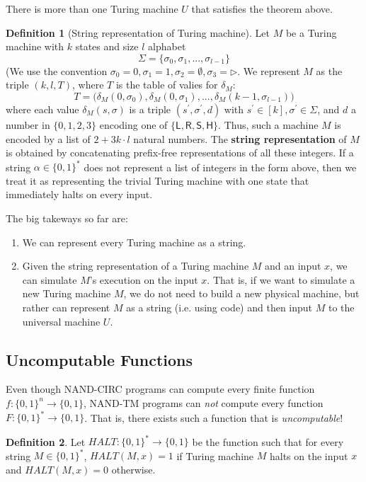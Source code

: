 \documentclass[a4paper, 12pt]{report}
\theoremstyle{remark}
\theoremstyle{definition}
\newtheorem{definition}{Definition}[section]
\begin{document}
There is more than one Turing machine $U$ that satisfies the theorem above. 

\begin{definition}[String representation of Turing machine]
Let $M$ be a Turing machine with $k$ states and size $l$ alphabet
\[\Sigma = \{\sigma_0, \sigma_1, ..., \sigma_{l-1}\}\]
(We use the convention $\sigma_0 = 0, \sigma_1 = 1, \sigma_2 = \emptyset, \sigma_3 = \triangleright$. We represent $M$ as the triple $(k, l, T)$, where $T$ is the table of valies for $\delta_M$: 
\[T = \big(\delta_M (0, \sigma_0), \delta_M (0, \sigma_1), ..., \delta_M (k-1, \sigma_{l-1})\big)\]
where each value $\delta_M (s, \sigma)$ is a triple $(s^\prime, \sigma^\prime, d)$ with $s^\prime \in [k], \sigma^\prime \in \Sigma$, and $d$ a number in $\{0,1,2,3\}$ encoding one of $\{\mathsf{L, R, S, H}\}$. Thus, such a machine $M$ is encoded by a list of $2 + 3k \cdot l$ natural numbers. The \textbf{string representation} of $M$ is obtained by concatenating prefix-free representations of all these integers. If a string $\alpha \in \{0,1\}^*$ does not represent a list of integers in the form above, then we treat it as representing the trivial Turing machine with one state that immediately halts on every input. 
\end{definition}
The big takeways so far are: 
\begin{enumerate}
    \item We can represent every Turing machine as a string. 
    \item Given the string representation of a Turing machine $M$ and an input $x$, we can simulate $M$'s execution on the input $x$. That is, if we want to simulate a new Turing machine $M$, we do not need to build a new physical machine, but rather can represent $M$ as a string (i.e. using code) and then input $M$ to the universal machine $U$. 
\end{enumerate}

\subsection{Uncomputable Functions}
Even though NAND-CIRC programs can compute every finite function $f: \{0,1\}^n \longrightarrow \{0,1\}$, NAND-TM programs can \textit{not} compute every function $F: \{0,1\}^* \longrightarrow \{0,1\}$. That is, there exists such a function that is \textit{uncomputable}! 

\begin{definition}
Let $HALT: \{0,1\}^* \longrightarrow \{0,1\}$ be the function such that for every string $M \in \{0,1\}^*$, $HALT(M, x) = 1$ if Turing machine $M$ halts on the input $x$ and $HALT(M, x) = 0$ otherwise. 
\end{definition}
\end{document}
